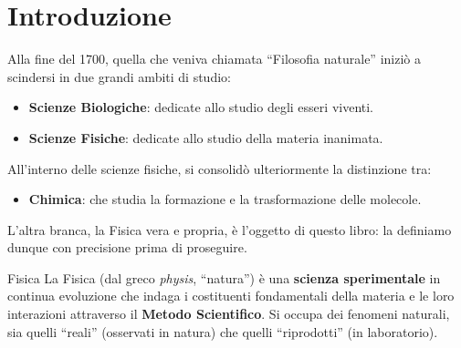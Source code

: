 \chapter{Introduzione}

Alla fine del 1700, quella che veniva chiamata ``Filosofia naturale'' iniziò a scindersi in due grandi ambiti di studio:
\begin{itemize}
    \item \textbf{Scienze Biologiche}: dedicate allo studio degli esseri viventi.
    \item \textbf{Scienze Fisiche}: dedicate allo studio della materia inanimata.
\end{itemize}
All'interno delle scienze fisiche, si consolidò ulteriormente la distinzione tra:
\begin{itemize}
    \item \textbf{Chimica}: che studia la formazione e la trasformazione delle molecole.
\end{itemize}
L'altra branca, la Fisica vera e propria, è l'oggetto di questo libro: la definiamo dunque con precisione prima di proseguire.

\begin{definizione}{Fisica}
La Fisica (dal greco \emph{physis}, ``natura'') è una \textbf{scienza sperimentale} in continua evoluzione che indaga i costituenti fondamentali della materia e le loro interazioni attraverso il \textbf{Metodo Scientifico}. Si occupa dei fenomeni naturali, sia quelli ``reali'' (osservati in natura) che quelli ``riprodotti'' (in laboratorio).
\end{definizione}


